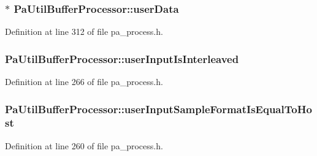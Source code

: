 \subsubsection[{\texorpdfstring{user\+Data}{userData}}]{$\ast$ Pa\+Util\+Buffer\+Processor\+::user\+Data}\hypertarget{struct_pa_util_buffer_processor_aa0c7b972bd1494d40373e9e13475af4b}{}\label{struct_pa_util_buffer_processor_aa0c7b972bd1494d40373e9e13475af4b}


Definition at line 312 of file pa\+\_\+process.\+h.

\subsubsection[{\texorpdfstring{user\+Input\+Is\+Interleaved}{userInputIsInterleaved}}]{ Pa\+Util\+Buffer\+Processor\+::user\+Input\+Is\+Interleaved}\hypertarget{struct_pa_util_buffer_processor_a08fb4a5b71ccc3aa1893d8e6c035d192}{}\label{struct_pa_util_buffer_processor_a08fb4a5b71ccc3aa1893d8e6c035d192}


Definition at line 266 of file pa\+\_\+process.\+h.

\subsubsection[{\texorpdfstring{user\+Input\+Sample\+Format\+Is\+Equal\+To\+Host}{userInputSampleFormatIsEqualToHost}}]{ Pa\+Util\+Buffer\+Processor\+::user\+Input\+Sample\+Format\+Is\+Equal\+To\+Host}\hypertarget{struct_pa_util_buffer_processor_a8667d06325ee28d95c48159ff49e044e}{}\label{struct_pa_util_buffer_processor_a8667d06325ee28d95c48159ff49e044e}


Definition at line 260 of file pa\+\_\+process.\+h.


